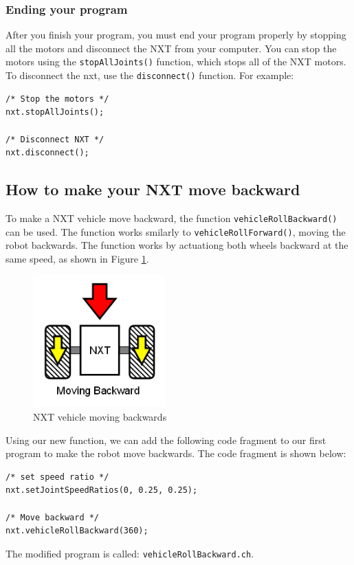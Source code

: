 \documentclass[11pt]{article}
\begin{document}
\subsubsection{Ending your program}
After you finish your program, you must end your program properly by stopping all the motors and 
disconnect the NXT from your computer. You can stop the motors using the \verb+stopAllJoints()+ 
function, which stops all of the NXT motors. To disconnect the nxt, use the \verb+disconnect()+ 
function. For example:

\begin{verbatim}
/* Stop the motors */
nxt.stopAllJoints();
    
/* Disconnect NXT */
nxt.disconnect();
\end{verbatim}

\subsection{How to make your NXT move backward}
To make a NXT vehicle move backward, the function \texttt{vehicleRollBackward()} can be used. 
The function works smilarly to \texttt{vehicleRollForward()}, moving the robot backwards. The 
function works by actuationg both wheels backward at the same speed, as shown in Figure 
\ref{fig_NXT_backward}.\\
\begin{figure}[h]
  \begin{center}
    \includegraphics[height=2in]{figure/mindstorm/Vehicle_back.png}
    \caption{NXT vehicle moving backwards\label{fig_NXT_backward}}
  \end{center}
\end{figure}
\noindent
Using our new function, we can add the following code fragment to our first program to make the robot
move backwards. The code fragment is shown below:
\begin{verbatim}
/* set speed ratio */
nxt.setJointSpeedRatios(0, 0.25, 0.25);

/* Move backward */
nxt.vehicleRollBackward(360);
\end{verbatim}
\noindent
The modified program is called: \verb+vehicleRollBackward.ch+.
\end{document}

